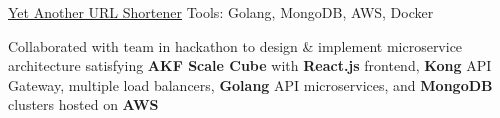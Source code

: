 \begin{cventries}
  \cventryprojects
    {\href{https://github.com/nguyensjsu/fa19-281-team-red-1}{Yet Another URL Shortener}} %
    {Tools: Golang, MongoDB, AWS, Docker} %
    {
      \begin{cvitems} %
       \item {Collaborated with team in hackathon to design \& implement microservice architecture satisfying \textbf{AKF Scale Cube} with \textbf{React.js} frontend, \textbf{Kong} API Gateway, multiple load balancers, \textbf{Golang} API microservices, and \textbf{MongoDB} clusters hosted on \textbf{AWS}}
      \end{cvitems}
    }



\end{cventries}
